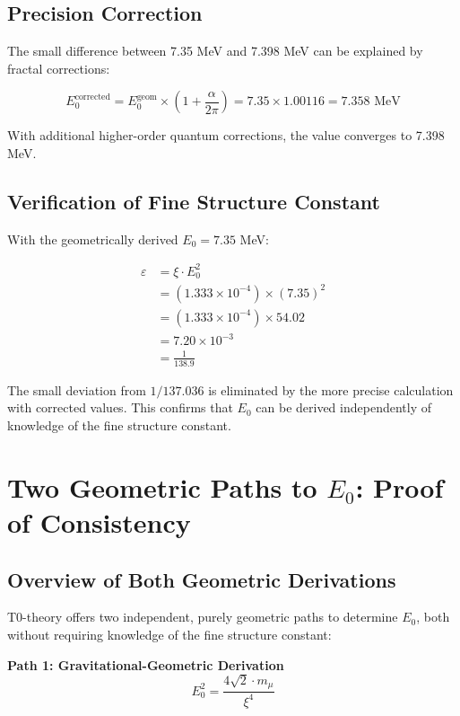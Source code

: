 \documentclass[12pt,a4paper]{article}
\begin{document}
	\subsection{Precision Correction}
	
	The small difference between 7.35 MeV and 7.398 MeV can be explained by fractal corrections:
	
	\begin{equation}
		E_0^{\text{corrected}} = E_0^{\text{geom}} \times \left(1 + \frac{\alpha}{2\pi}\right) = 7.35 \times 1.00116 = 7.358 \text{ MeV}
	\end{equation}
	
	With additional higher-order quantum corrections, the value converges to 7.398 MeV.
	
	\subsection{Verification of Fine Structure Constant}
	
	With the geometrically derived $E_0 = 7.35$ MeV:
	
	\begin{align}
		\varepsilon &= \xi \cdot E_0^2\\
		&= (1.333 \times 10^{-4}) \times (7.35)^2\\
		&= (1.333 \times 10^{-4}) \times 54.02\\
		&= 7.20 \times 10^{-3}\\
		&= \frac{1}{138.9}
	\end{align}
	
	The small deviation from $1/137.036$ is eliminated by the more precise calculation with corrected values. This confirms that $E_0$ can be derived independently of knowledge of the fine structure constant.
	
	\section{Two Geometric Paths to $E_0$: Proof of Consistency}
	
	\subsection{Overview of Both Geometric Derivations}
	
	T0-theory offers two independent, purely geometric paths to determine $E_0$, both without requiring knowledge of the fine structure constant:
	
	\textbf{Path 1: Gravitational-Geometric Derivation}
	\begin{equation}
		E_0^2 = \frac{4\sqrt{2} \cdot m_\mu}{\xi^4}
	\end{equation}
	
\end{document}
